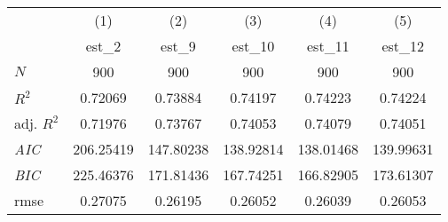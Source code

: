 {
\def\sym#1{\ifmmode^{#1}\else\(^{#1}\)\fi}
\begin{tabular}{l*{5}{c}}
\hline\hline
            &\multicolumn{1}{c}{(1)}&\multicolumn{1}{c}{(2)}&\multicolumn{1}{c}{(3)}&\multicolumn{1}{c}{(4)}&\multicolumn{1}{c}{(5)}\\
            &\multicolumn{1}{c}{est\_2}&\multicolumn{1}{c}{est\_9}&\multicolumn{1}{c}{est\_10}&\multicolumn{1}{c}{est\_11}&\multicolumn{1}{c}{est\_12}\\
\hline
\hline
\(N\)       &         900         &         900         &         900         &         900         &         900         \\
\(R^{2}\)   &     0.72069         &     0.73884         &     0.74197         &     0.74223         &     0.74224         \\
adj. \(R^{2}\)&     0.71976         &     0.73767         &     0.74053         &     0.74079         &     0.74051         \\
\textit{AIC}&   206.25419         &   147.80238         &   138.92814         &   138.01468         &   139.99631         \\
\textit{BIC}&   225.46376         &   171.81436         &   167.74251         &   166.82905         &   173.61307         \\
rmse        &     0.27075         &     0.26195         &     0.26052         &     0.26039         &     0.26053         \\
\hline\hline
\end{tabular}
}
